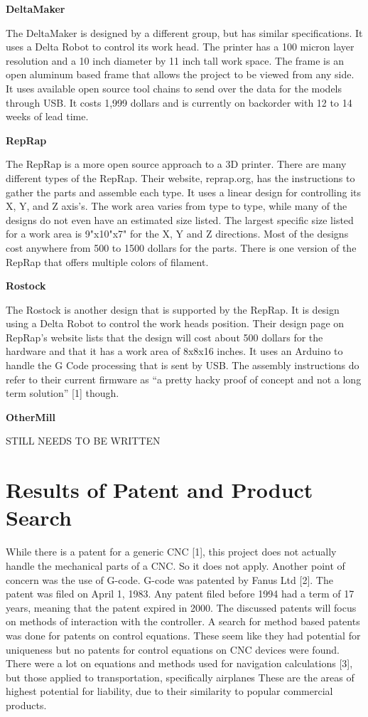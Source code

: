 \textbf{DeltaMaker}

The DeltaMaker is designed by a different group, but has similar specifications. 
It uses a Delta Robot to control its work head. The printer has a 100 micron layer resolution and a 10 inch diameter by 11 inch tall work space. 
The frame is an open aluminum based frame that allows the project to be viewed from any side. 
It uses available open source tool chains to send over the data for the models through USB. 
It costs 1,999 dollars and is currently on backorder with 12 to 14 weeks of lead time.  

\textbf{RepRap}

The RepRap is a more open source approach to a 3D printer. 
There are many different types of the RepRap. 
Their website, reprap.org, has the instructions to gather the parts and assemble each type. 
It uses a linear design for controlling its X, Y, and Z axis’s. 
The work area varies from type to type, while many of the designs do not even have an estimated size listed. 
The largest specific size listed for a work area is 9"x10"x7" for the X, Y and Z directions. 
Most of the designs cost anywhere from 500 to 1500 dollars for the parts. 
There is one version of the RepRap that offers multiple colors of filament.

\textbf{Rostock}

The Rostock is another design that is supported by the RepRap. 
It is design using a Delta Robot to control the work heads position. 
Their design page on RepRap’s website lists that the design will cost about 500 dollars for the hardware and that it has a work area of 8x8x16 inches. 
It uses an Arduino to handle the G Code processing that is sent by USB. 
The assembly instructions do refer to their current firmware as “a pretty hacky proof of concept and not a long term solution” [1] though.

\textbf{OtherMill}

STILL NEEDS TO BE WRITTEN


\section{Results of Patent and Product Search}


While there is a patent for a generic CNC [1], this project does not actually handle the mechanical parts of a CNC.
So it does not apply. 
Another point of concern was the use of G-code. G-code was patented by Fanus Ltd [2]. 
The patent was filed on April 1, 1983. 
Any patent filed before 1994 had a term of 17 years, meaning that the patent expired in 2000. 
The discussed patents will focus on methods of interaction with the controller. 
A search for method based patents was done for patents on control equations. 
These seem like they had potential for uniqueness but no patents for control equations on CNC devices were found. 
There were a lot on equations and methods used for navigation calculations [3], but those applied to transportation, specifically airplanes These are the areas of highest potential for liability, due to their similarity to popular commercial products.


